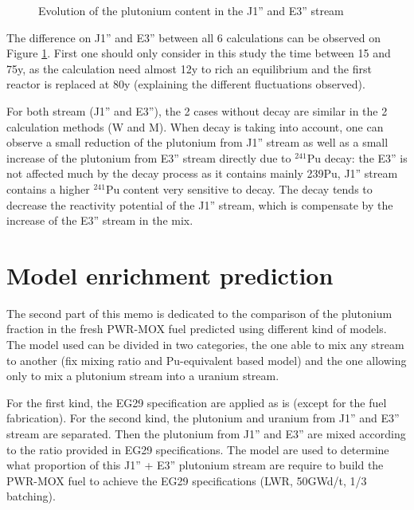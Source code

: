 \documentclass[10pt]{article}
\begin{document}
\begin{figure}[h!]
  \centering
  \caption{Evolution of the plutonium content in the J1'' and  E3'' stream\label{fig:MW_flow} }
\end{figure}

The difference on J1'' and E3'' between all 6 calculations can be observed on
Figure \ref{fig:MW_flow}. First one should only consider in this study the time
between 15 and 75y, as the calculation need almost 12y to rich an equilibrium
and the first reactor is replaced at 80y (explaining the different fluctuations
observed). 

For both stream (J1'' and E3''), the 2 cases without decay are similar in the 2
calculation methods (W and M). When decay is taking into account, one can
observe a small reduction of the plutonium from  J1'' stream as well as a small
increase of the plutonium from E3'' stream directly due to $^{241}$Pu decay: the E3''
is not affected much by the decay process as it contains mainly 239Pu, J1''
stream contains a higher $^{241}$Pu content very sensitive to decay.  The decay tends
to decrease the reactivity potential of the J1'' stream, which is compensate by
the increase of the E3'' stream in the mix.


\section{Model enrichment prediction}

The second part of this memo is dedicated to the comparison of the plutonium
fraction in the fresh PWR-MOX fuel predicted using different kind of models. The
model used can be divided in two categories, the one able to mix any stream to
another (fix mixing ratio and Pu-equivalent based model) and the one allowing
only to mix a plutonium stream into a uranium stream.  

For the first kind, the EG29 specification are applied as is (except for the
fuel fabrication). For the second kind, the plutonium and uranium from J1'' and
E3'' stream are separated.  Then the plutonium from J1'' and E3'' are mixed
according to the ratio provided in EG29 specifications. The model are used to
determine what proportion of this J1'' + E3'' plutonium stream are require to
build the PWR-MOX fuel to achieve the EG29 specifications (LWR, 50GWd/t, 1/3
batching).
\end{document}
